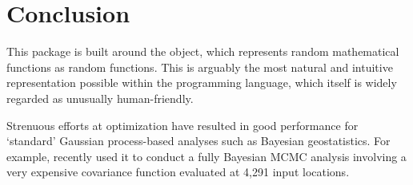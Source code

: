\documentclass[article]{jss}
\begin{document}



 

 

% 
% 
%  

\section{Conclusion}

This package is built around the  object, which represents random mathematical functions as random  functions. This is arguably the most natural and intuitive representation possible within the  programming language, which itself is widely regarded as unusually human-friendly.

Strenuous efforts at optimization have resulted in good performance for `standard' Gaussian process-based analyses such as Bayesian geostatistics. For example, \cite{map} recently used it to conduct a fully Bayesian MCMC analysis involving a very expensive covariance function evaluated at 4,291 input locations. 
\end{document}
